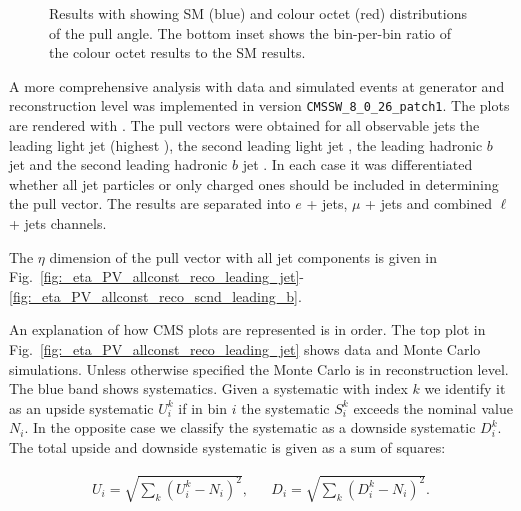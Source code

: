 \begin{figure}[htp]
\centering
  \def\twidth{0.45}
  \centering
  \hfil
\caption{Results with \RIVET showing SM (blue) and \PW colour octet (red) distributions of the pull angle. The bottom inset shows the bin-per-bin ratio of the \PW colour octet results to the SM results.}
\label{fig:resultsRivet}
\end{figure}

A more comprehensive analysis with data and simulated events at generator and reconstruction level was implemented in \CMSSW version \lstinline[language=sh]|CMSSW_8_0_26_patch1|. The plots are rendered with \ROOT \cite{Brun}. The pull vectors were obtained for all observable jets \textendash the leading light jet \leadingjet (highest \pt), the second leading light jet \scndleadingjet, the leading hadronic $b$ jet \leadingb and the second leading hadronic $b$ jet \scndleadingb. In each case it was differentiated whether all jet particles or only charged ones should be included in determining the pull vector. The results are separated into $e$ + jets, $\mu$ + jets and combined $\ell$ + jets channels.

The $\eta$ dimension of the pull vector with all jet components is given in Fig.~\ref{fig:_eta_PV_allconst_reco_leading_jet}-\ref{fig:_eta_PV_allconst_reco_scnd_leading_b}.

An explanation of how CMS plots are represented is in order. The top plot in Fig.~\ref{fig:_eta_PV_allconst_reco_leading_jet} shows data and Monte Carlo simulations. Unless otherwise specified the Monte Carlo is in reconstruction level. The blue band shows systematics. Given a systematic with index $k$ we identify it as an upside systematic $U^{k}_{i}$ if in bin $i$ the systematic $S^{k}_i$ exceeds the nominal value $N_{i}$. In the opposite case we classify the systematic as a downside systematic $D^{k}_{i}$. The total upside and downside systematic is given as a sum of squares:

\begin{align}
U_{i}=\sqrt{\sum_{k}\left(U^{k}_{i}-N_{i}\right)^{2}}, && D_{i}=\sqrt{\sum_{k}\left(D^{k}_{i}-N_{i}\right)^{2}}.
\end{align}

